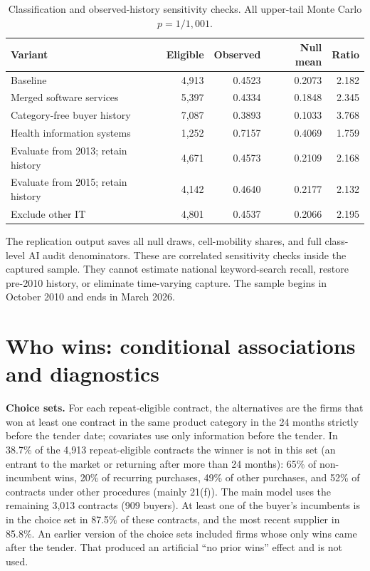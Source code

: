 \documentclass[11pt,a4paper]{article}
\newcommand{\botrule}{\bottomrule}
\begin{document}
\begin{table}[h]\centering\small
\caption{Classification and observed-history sensitivity checks. All upper-tail Monte Carlo $p=1/1{,}001$.}\label{tab:revision_e_stress}
\begin{tabular}{@{}lrrrr@{}}
\toprule
Variant & Eligible & Observed & Null mean & Ratio\\
\midrule
Baseline & 4,913 & 0.4523 & 0.2073 & 2.182\\
Merged software services & 5,397 & 0.4334 & 0.1848 & 2.345\\
Category-free buyer history & 7,087 & 0.3893 & 0.1033 & 3.768\\
Health information systems & 1,252 & 0.7157 & 0.4069 & 1.759\\
Evaluate from 2013; retain history & 4,671 & 0.4573 & 0.2109 & 2.168\\
Evaluate from 2015; retain history & 4,142 & 0.4640 & 0.2177 & 2.132\\
Exclude other IT & 4,801 & 0.4537 & 0.2066 & 2.195\\
\botrule
\end{tabular}
\end{table}

The replication output saves all null draws, cell-mobility shares, and full class-level AI audit denominators. These are correlated sensitivity checks inside the captured sample. They cannot estimate national keyword-search recall, restore pre-2010 history, or eliminate time-varying capture. The sample begins in October 2010 and ends in March 2026.

\section{Who wins: conditional associations and diagnostics}
\textbf{Choice sets.} For each repeat-eligible contract, the alternatives are the firms that won at least one contract in the same product category in the 24 months strictly before the tender date; covariates use only information before the tender. In 38.7\% of the 4,913 repeat-eligible contracts the winner is not in this set (an entrant to the market or returning after more than 24 months): 65\% of non-incumbent wins, 20\% of recurring purchases, 49\% of other purchases, and 52\% of contracts under other procedures (mainly 21(f)). The main model uses the remaining 3,013 contracts (909 buyers). At least one of the buyer's incumbents is in the choice set in 87.5\% of these contracts, and the most recent supplier in 85.8\%. An earlier version of the choice sets included firms whose only wins came after the tender. That produced an artificial ``no prior wins'' effect and is not used.
\end{document}
